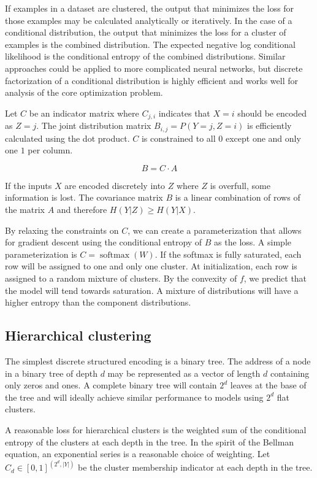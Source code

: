 \documentclass[11pt,letterpaper]{article}
\begin{document}
If examples in a dataset are clustered, the output that minimizes the loss for those examples may be calculated analytically or iteratively. In the case of a conditional distribution, the output that minimizes the loss for a cluster of examples is the combined distribution. The expected negative log conditional likelihood is the conditional entropy of the combined distributions. Similar approaches could be applied to more complicated neural networks, but discrete factorization of a conditional distribution is highly efficient and works well for analysis of the core optimization problem.

Let $C$ be an indicator matrix where $C_{j,i}$ indicates that $X=i$ should be encoded as $Z=j$. The joint distribution matrix $B_{i,j}=P(Y=j,Z=i)$ is efficiently calculated using the dot product. $C$ is constrained to all $0$ except one and only one $1$ per column.

$$B = C \cdot A $$ 

If the inputs $X$ are encoded discretely into $Z$ where $Z$ is overfull, some information is lost.  The covariance matrix $B$ is a linear combination of rows of the matrix $A$ and therefore $H(Y|Z) \ge H(Y|X)$. 

By relaxing the constraints on $C$, we can create a parameterization that allows for gradient descent using the conditional entropy of $B$ as the loss. A simple parameterization
is $C=\operatorname{softmax}(W)$. If the softmax is fully saturated, each row will be assigned to one and only one cluster. At initialization, each row is assigned to a random mixture of clusters. By the convexity of $f$, we predict that the model will tend towards saturation. A mixture of distributions will have a higher entropy than the component distributions.

\subsection{Hierarchical clustering}

The simplest discrete structured encoding is a binary tree. The address of a node in a binary tree of depth $d$ may be represented as a vector of length $d$ containing only zeros and ones. A complete binary tree will contain $2^d$ leaves at the base of the tree and will ideally achieve similar performance to models using $2^d$ flat clusters.

A reasonable loss for hierarchical clusters is the weighted sum of the conditional entropy of the clusters at each depth in the tree. In the spirit of the Bellman equation, an exponential series is a reasonable choice of weighting. Let $C_d \in [0,1]^{(2^d, \lvert Y \rvert)}$ be the cluster membership indicator at each depth in the tree.
\end{document}
